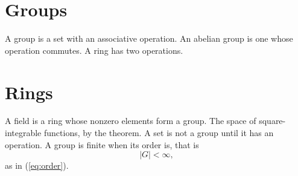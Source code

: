 \documentclass{article}
\begin{document}
\section{Groups}
A group is a set with an associative operation.
An abelian group is one whose operation commutes.
A ring has two operations.
\newpage
\section{Rings}
A field is a ring whose nonzero elements form a group.
The space of square-integrable functions, by the
theorem.
A set is not a group until it has
an operation.
A group is finite when its order is, that is
\begin{equation}\label{eq:order}|G| < \infty,\end{equation}
as in (\ref{eq:order}).
\printindex
\end{document}
